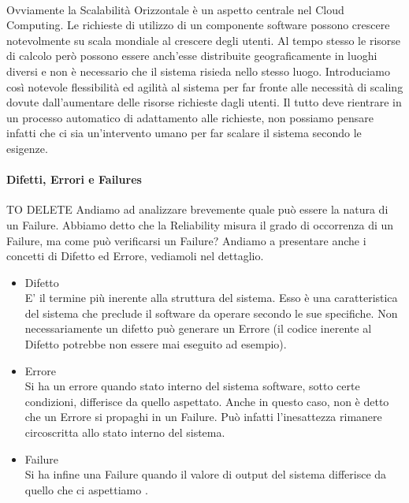 \paragraph{}
Ovviamente la Scalabilità Orizzontale è un aspetto centrale nel Cloud Computing. Le richieste di utilizzo di un componente software possono crescere notevolmente su scala mondiale al crescere degli utenti. Al tempo stesso le risorse di calcolo però possono essere anch'esse distribuite geograficamente in luoghi diversi e non è necessario che il sistema risieda nello stesso luogo. Introduciamo così notevole flessibilità ed agilità al sistema per far fronte alle necessità di scaling dovute dall'aumentare delle risorse richieste dagli utenti. Il tutto deve rientrare in un processo automatico di adattamento alle richieste, non possiamo pensare infatti che ci sia un'intervento umano per far scalare il sistema secondo le esigenze.


























\paragraph{Difetti, Errori e Failures}
TO DELETE
Andiamo ad analizzare brevemente quale può essere la natura di un Failure. Abbiamo detto che la Reliability misura il grado di occorrenza di un Failure, ma come può verificarsi un Failure? Andiamo a presentare anche i concetti di Difetto ed Errore, vediamoli nel dettaglio.
\begin{itemize}
	\item Difetto \\
	E' il termine più inerente alla struttura del sistema. Esso è una caratteristica del sistema che preclude il software da operare secondo le sue specifiche. Non necessariamente un difetto può generare un Errore (il codice inerente al Difetto potrebbe non essere mai eseguito ad esempio).
	
	\item  Errore \\
	Si ha un errore quando stato interno del sistema software, sotto certe condizioni, differisce da quello aspettato. Anche in questo caso, non è detto che un Errore si propaghi in un Failure. Può infatti l'inesattezza rimanere circoscritta allo stato interno del sistema. 
	
	\item  Failure \\
	Si ha infine una Failure quando il valore di output del sistema differisce da quello che ci aspettiamo .
\end{itemize}


